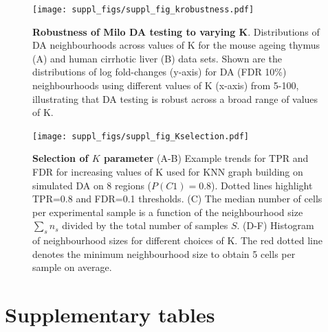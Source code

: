 \documentclass[
]{article}
\begin{document}
\begin{figure}
\centering
\texttt{[image: suppl\_figs/suppl\_fig\_krobustness.pdf]}
\caption{\label{fig:sup-fig-robustness}\textbf{Robustness of Milo DA testing to varying K}. Distributions of DA neighbourhoods across values of K for the mouse ageing thymus (A) and human cirrhotic liver (B) data sets. Shown are the distributions of log fold-changes (y-axis) for DA (FDR 10\%) neighbourhoods using different values of K (x-axis) from 5-100, illustrating that DA testing is robust across a broad range of values of K.}
\end{figure}



\begin{figure}
\centering
\texttt{[image: suppl\_figs/suppl\_fig\_Kselection.pdf]}
\caption{\label{fig:sup-fig-Kselection}\textbf{Selection of \(K\) parameter}
(A-B) Example trends for TPR and FDR for increasing values of K used for KNN graph building on simulated DA on 8 regions (\(P(C1) = 0.8\)). Dotted lines highlight TPR=0.8 and FDR=0.1 thresholds. (C) The median number of cells per experimental sample is a function of the neighbourhood size \(\sum_s{n_s}\) divided by the total number of samples \(S\). (D-F) Histogram of neighbourhood sizes for different choices of K. The red dotted line denotes the minimum neighbourhood size to obtain 5 cells per sample on average.}
\end{figure}




\newpage

\hypertarget{supplementary-tables}{%
\section*{Supplementary tables}\label{supplementary-tables}}

\renewcommand{\figurename}{Supplementary Table}
\setcounter{figure}{0}
\end{document}

